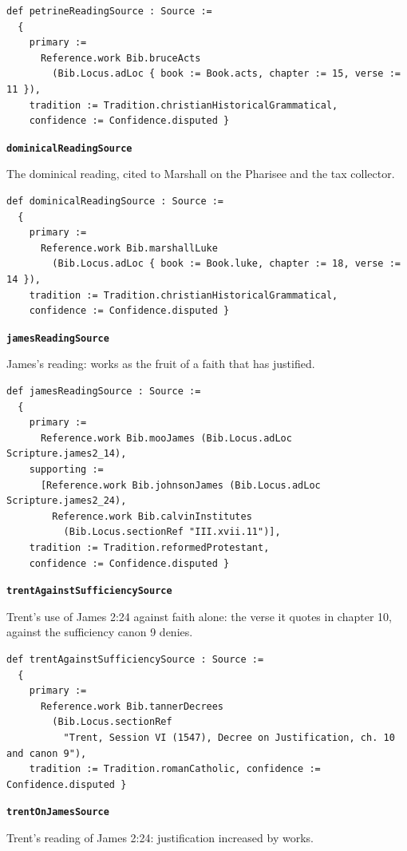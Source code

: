 \documentclass[11pt]{article}
\begin{document}
{\small\begin{verbatim}
def petrineReadingSource : Source :=
  {
    primary :=
      Reference.work Bib.bruceActs
        (Bib.Locus.adLoc { book := Book.acts, chapter := 15, verse := 11 }),
    tradition := Tradition.christianHistoricalGrammatical,
    confidence := Confidence.disputed }
\end{verbatim}}
\par\medskip\noindent\textbf{\texttt{dominical\allowbreak{}Reading\allowbreak{}Source}}\par\nobreak\noindent
The dominical reading, cited to Marshall on the Pharisee and the tax collector.

{\small\begin{verbatim}
def dominicalReadingSource : Source :=
  {
    primary :=
      Reference.work Bib.marshallLuke
        (Bib.Locus.adLoc { book := Book.luke, chapter := 18, verse := 14 }),
    tradition := Tradition.christianHistoricalGrammatical,
    confidence := Confidence.disputed }
\end{verbatim}}
\par\medskip\noindent\textbf{\texttt{james\allowbreak{}Reading\allowbreak{}Source}}\par\nobreak\noindent
James's reading: works as the fruit of a faith that has justified.

{\small\begin{verbatim}
def jamesReadingSource : Source :=
  {
    primary :=
      Reference.work Bib.mooJames (Bib.Locus.adLoc Scripture.james2_14),
    supporting :=
      [Reference.work Bib.johnsonJames (Bib.Locus.adLoc Scripture.james2_24),
        Reference.work Bib.calvinInstitutes
          (Bib.Locus.sectionRef "III.xvii.11")],
    tradition := Tradition.reformedProtestant,
    confidence := Confidence.disputed }
\end{verbatim}}
\par\medskip\noindent\textbf{\texttt{trent\allowbreak{}Against\allowbreak{}Sufficiency\allowbreak{}Source}}\par\nobreak\noindent
Trent's use of James 2:24 against faith alone: the verse it quotes in chapter 10, against the sufficiency canon 9 denies.

{\small\begin{verbatim}
def trentAgainstSufficiencySource : Source :=
  {
    primary :=
      Reference.work Bib.tannerDecrees
        (Bib.Locus.sectionRef
          "Trent, Session VI (1547), Decree on Justification, ch. 10 and canon 9"),
    tradition := Tradition.romanCatholic, confidence := Confidence.disputed }
\end{verbatim}}
\par\medskip\noindent\textbf{\texttt{trent\allowbreak{}On\allowbreak{}James\allowbreak{}Source}}\par\nobreak\noindent
Trent's reading of James 2:24: justification increased by works.
\end{document}
